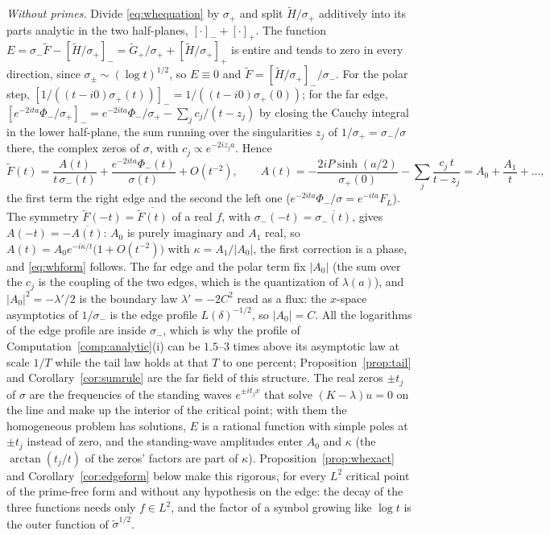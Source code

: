 \documentclass[11pt]{article}
\theoremstyle{definition}
\theoremstyle{remark}
\begin{document}
\emph{Without primes.} Divide \eqref{eq:whequation} by $\sigma_+$ and split $\tilde H/\sigma_+$ additively into its parts analytic in the two half-planes, $[\cdot]_-+[\cdot]_+$. The function $E=\sigma_-\tilde F-[\tilde H/\sigma_+]_-=\tilde G_+/\sigma_++[\tilde H/\sigma_+]_+$ is entire and tends to zero in every direction, since $\sigma_\pm\sim(\log t)^{1/2}$, so $E\equiv0$ and $\tilde F=[\tilde H/\sigma_+]_-/\sigma_-$. For the polar step, $[1/((t-i0)\sigma_+(t))]_-=1/((t-i0)\sigma_+(0))$; for the far edge, $[e^{-2ita}\Phi_-/\sigma_+]_-=e^{-2ita}\Phi_-/\sigma_+-\sum_jc_j/(t-z_j)$ by closing the Cauchy integral in the lower half-plane, the sum running over the singularities $z_j$ of $1/\sigma_+=\sigma_-/\sigma$ there, the complex zeros of $\sigma$, with $c_j\propto e^{-2iz_ja}$. Hence
\[
\tilde F(t)=\frac{A(t)}{t\,\sigma_-(t)}+\frac{e^{-2ita}\Phi_-(t)}{\sigma(t)}+O(t^{-2}),\qquad A(t)=-\frac{2iP\sinh(a/2)}{\sigma_+(0)}-\sum_j\frac{c_j\,t}{t-z_j}=A_0+\frac{A_1}t+\dots ,
\]
the first term the right edge and the second the left one ($e^{-2ita}\Phi_-/\sigma=e^{-ita}F_L$). The symmetry $\tilde F(-t)=\overline{\tilde F(t)}$ of a real $f$, with $\sigma_-(-t)=\overline{\sigma_-(t)}$, gives $A(-t)=-\overline{A(t)}$: $A_0$ is purely imaginary and $A_1$ real, so $A(t)=A_0e^{-i\kappa/t}\big(1+O(t^{-2})\big)$ with $\kappa=A_1/|A_0|$, the first correction is a phase, and \eqref{eq:whform} follows. The far edge and the polar term fix $|A_0|$ (the sum over the $c_j$ is the coupling of the two edges, which is the quantization of $\lambda(a)$), and $|A_0|^2=-\lambda'/2$ is the boundary law $\lambda'=-2C^2$ read as a flux: the $x$-space asymptotics of $1/\sigma_-$ is the edge profile $L(\delta)^{-1/2}$, so $|A_0|=C$. All the logarithms of the edge profile are inside $\sigma_-$, which is why the profile of Computation~\ref{comp:analytic}(i) can be $1.5$--$3$ times above its asymptotic law at scale $1/T$ while the tail law holds at that $T$ to one percent; Proposition~\ref{prop:tail} and Corollary~\ref{cor:sumrule} are the far field of this structure. The real zeros $\pm t_j$ of $\sigma$ are the frequencies of the standing waves $e^{\pm it_jx}$ that solve $(K-\lambda)u=0$ on the line and make up the interior of the critical point; with them the homogeneous problem has solutions, $E$ is a rational function with simple poles at $\pm t_j$ instead of zero, and the standing-wave amplitudes enter $A_0$ and $\kappa$ (the $\arctan(t_j/t)$ of the zeros' factors are part of $\kappa$). Proposition~\ref{prop:whexact} and Corollary~\ref{cor:edgeform} below make this rigorous, for every $L^2$ critical point of the prime-free form and without any hypothesis on the edge: the decay of the three functions needs only $f\in L^2$, and the factor of a symbol growing like $\log t$ is the outer function of $\tilde\sigma^{1/2}$.
\end{document}
